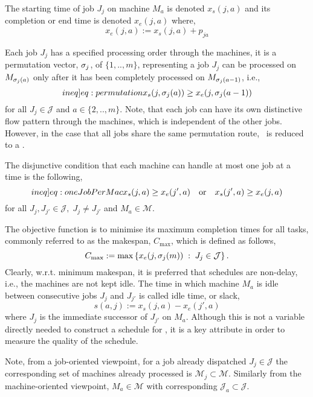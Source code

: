 The starting time of job $J_j$ on machine $M_a$ is denoted $x_s(j,a)$ and its 
completion or end time is denoted $x_e(j,a)$ where, 
\begin{equation}  x_e(j,a):=x_s(j,a)+p_{ja} \end{equation} 


Each job $J_j$ has a specified processing order through the machines, it is a 
permutation vector, ${\mathbf{\sigma}}_j$, of $\{1,..,m\}$, representing a job $J_j$ can 
be processed on $M_{{\mathbf{\sigma}}_j(a)}$ only after it has been completely processed 
on $M_{{\mathbf{\sigma}}_j(a-1)}$, i.e.,
\begin{equation}\label[ineq]{eq:permutation}
x_s(j,\vsigma_j(a)) \geq x_e(j,\vsigma_j(a-1)) 
\end{equation}
for all $J_j\in\mathcal{J}$ and $a\in\{2,..,m\}$. 
Note, that each job can have its own distinctive flow pattern through the 
machines, which is independent of the other jobs. However, in the case that all 
jobs share the same permutation route, \JSP\ is reduced to a \FSP.

The disjunctive condition that each machine can handle at most one job at a 
time is the following,
\begin{equation}\label[ineq]{eq:oneJobPerMac}
x_s(j,a) \geq x_e(j',a) \quad\textrm{or}\quad x_s(j',a) \geq x_e(j,a)  
\end{equation}
for all $J_j,J_{j'}\in\mathcal{J},\; J_j\neq J_{j'}$ and $M_a\in\mathcal{M}$. 

The objective function is to minimise its maximum completion times for all 
tasks, commonly referred to as the makespan, $C_{\max}$, which is defined as 
follows,
\begin{equation}
C_{\max} := \max\condset{x_e(j,\vsigma_j(m))}{J_j\in\mathcal{J}}.
\label{eq:makespan}
\end{equation} 
Clearly, w.r.t. minimum makespan, it is preferred that schedules are non-delay, 
i.e., the machines are not kept idle. The time in which machine $M_a$ is idle 
between consecutive jobs $J_j$ and $J_{j'}$ is called idle time, or slack,
\begin{equation} 
s(a,j):=x_s(j,a)-x_e(j',a) \label{eq:slack}
\end{equation}
where $J_j$ is the immediate successor of $J_{j'}$ on $M_a$. Although this is 
not a variable directly needed to construct a schedule for \JSP, it is a key 
attribute in order to measure the quality of the schedule. 

Note, from a job-oriented viewpoint, for a job already dispatched 
$J_j\in\mathcal{J}$ the corresponding set of machines already processed is 
$\mathcal{M}_j\subset\mathcal{M}$. Similarly from the machine-oriented 
viewpoint, $M_a\in\mathcal{M}$ with corresponding 
$\mathcal{J}_a\subset\mathcal{J}$. 

